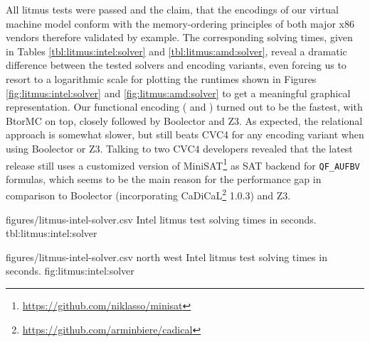 All litmus tests were passed and the claim, that the encodings of our virtual machine model conform with the memory-ordering principles of both major x86 vendors therefore validated by example.
The corresponding solving times, given in Tables \ref{tbl:litmus:intel:solver} and \ref{tbl:litmus:amd:solver}, reveal a dramatic difference
between the tested solvers and encoding variants,
even forcing us to resort to
a logarithmic scale for plotting the runtimes shown in Figures \ref{fig:litmus:intel:solver} and \ref{fig:litmus:amd:solver} to get a meaningful graphical representation.
Our functional encoding ({\BTOR} and {\SMTLIB}) turned out to be the fastest, with BtorMC on top, closely followed by Boolector and Z3.
As expected, the relational {\SMTLIB} approach is somewhat slower, but still beats CVC4 for any encoding variant when using Boolector or Z3.
Talking to two CVC4 developers revealed that the latest release still uses a customized version of MiniSAT\footnote{\url{https://github.com/niklasso/minisat}} %
as SAT backend for \texttt{QF_AUFBV} formulas, which seems to be the main reason
for the performance gap
in comparison to Boolector (incorporating CaDiCaL\footnote{\url{https://github.com/arminbiere/cadical}} 1.0.3) and Z3.

\newpage

\SolverStatsTable
  {figures/litmus-intel-solver.csv}
  {\textnumero}
  {\IntelRowHeader}
  {Intel litmus test solving times in seconds.}
  {tbl:litmus:intel:solver}

\SolverStatsGraph
  {figures/litmus-intel-solver.csv}
  {north west}
  {Intel litmus test solving times in seconds.}
  {fig:litmus:intel:solver}

\newpage



